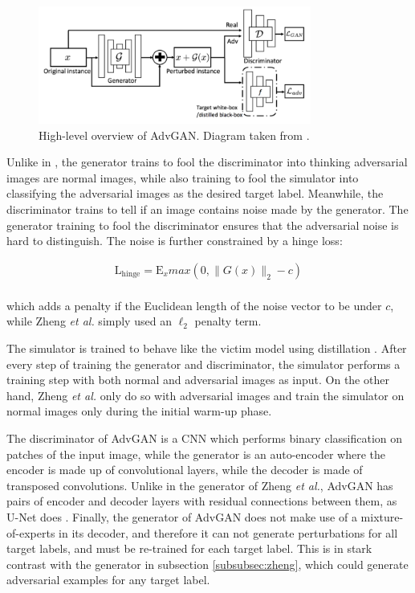 \begin{figure}[h]
    \centering
    \includegraphics[width=0.8\textwidth]{graphics/advgan.PNG}
    \caption{High-level overview of AdvGAN. Diagram taken from \cite{advGAN}.}
    \label{fig:advgan}
\end{figure}

Unlike in \cite{zheng_black_box_GAN}, the generator trains to fool the discriminator into thinking adversarial images are normal images, while also training to fool the simulator into classifying the adversarial images as the desired target label. Meanwhile, the discriminator trains to tell if an image contains noise made by the generator. The generator training to fool the discriminator ensures that the adversarial noise is hard to distinguish. The noise is further constrained by a hinge loss:

\begin{equation}
\begin{aligned}
\mathrm{L}_\textrm{hinge} = \mathrm{E}_x max(0, \|G(x)\|_2 - c)\\
\label{eq:advgan_hing_loss}
\end{aligned}
\end{equation}

which adds a penalty if the Euclidean length of the noise vector to be under $c$, while Zheng \textit{et al.} simply used an $\ell_2$ penalty term.

The simulator is trained to behave like the victim model using distillation \cite{distillation}. After every step of training the generator and discriminator, the simulator performs a training step with both normal and adversarial images as input. On the other hand, Zheng \textit{et al.} \cite{zheng_black_box_GAN} only do so with adversarial images and train the simulator on normal images only during the initial warm-up phase.

The discriminator of AdvGAN is a CNN which performs binary classification on patches of the input image, while the generator is an auto-encoder where the encoder is made up of convolutional layers, while the decoder is made of transposed convolutions. Unlike in the generator of Zheng \textit{et al.}, AdvGAN has pairs of encoder and decoder layers with residual connections between them, as U-Net does \cite{unet}. Finally, the generator of AdvGAN does not make use of a mixture-of-experts in its decoder, and therefore it can not generate perturbations for all target labels, and must be re-trained for each target label. This is in stark contrast with the generator in subsection \ref{subsubsec:zheng}, which could generate adversarial examples for any target label.

